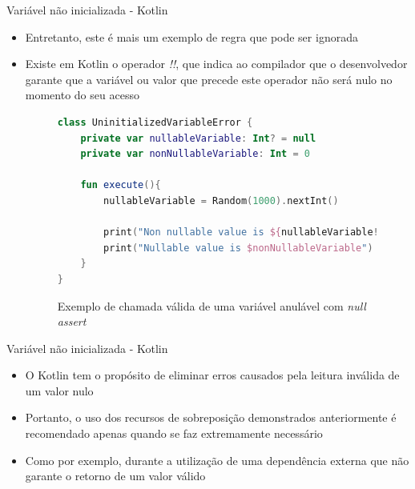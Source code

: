 \documentclass[brazilian]{beamer}
\begin{document}
\begin{frame}[fragile]{Variável não inicializada - Kotlin}
    \begin{itemize}
        \item Entretanto, este é mais um exemplo de regra que pode ser ignorada
        \item Existe em Kotlin o operador \emph{!!}, que indica ao compilador que o desenvolvedor garante que a variável ou valor que precede este operador não será nulo no momento do seu acesso
        \begin{figure}[H]
            \centering
            \begin{lstlisting}[language=Kotlin]
class UninitializedVariableError {
    private var nullableVariable: Int? = null
    private var nonNullableVariable: Int = 0

    fun execute(){
        nullableVariable = Random(1000).nextInt()
        
        print("Non nullable value is ${nullableVariable!!.toFloat()}")
        print("Nullable value is $nonNullableVariable")
    }
}
            \end{lstlisting}
            \caption{Exemplo de chamada válida de uma variável anulável com \textit{null assert}}
            \label{fig:kotlin_not_init_variable_valid_null_assert}
        \end{figure}
    \end{itemize}
\end{frame}

\begin{frame}{Variável não inicializada - Kotlin}
    \begin{itemize}
        \item O Kotlin tem o propósito de eliminar erros causados pela leitura inválida de um valor nulo
        \item Portanto, o uso dos recursos de sobreposição demonstrados anteriormente é recomendado apenas quando se faz extremamente necessário
        \item Como por exemplo, durante a utilização de uma dependência externa que não garante o retorno de um valor válido
    \end{itemize}
\end{frame}
\end{document}
